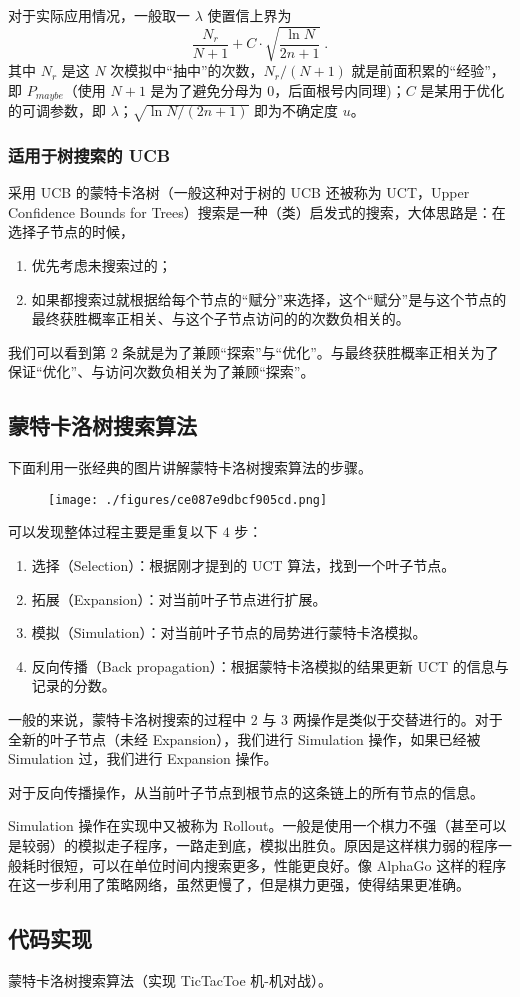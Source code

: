 对于实际应用情况，一般取一 $\lambda$ 使置信上界为
$$\frac{N_r}{N+1} + C \cdot \sqrt{\frac{\ln N}{2n+1}} ~.$$
其中 $N_r$ 是这 $N$ 次模拟中“抽中”的次数，$N_r/(N+1)$ 就是前面积累的“经验”，即 $P_{maybe}$（使用 $N+1$ 是为了避免分母为 $0$，后面根号内同理)；$C$ 是某用于优化的可调参数，即 $\lambda$；$\sqrt{\ln N/(2n+1)}$ 即为不确定度 $u$。

\subsubsection{适用于树搜索的 UCB}
采用 UCB 的蒙特卡洛树（一般这种对于树的 UCB 还被称为 UCT，Upper Confidence Bounds for Trees）搜索是一种（类）启发式的搜索，大体思路是：在选择子节点的时候，
\begin{enumerate}
\item 优先考虑未搜索过的；
\item 如果都搜索过就根据给每个节点的“赋分”来选择，这个“赋分”是与这个节点的最终获胜概率正相关、与这个子节点访问的的次数负相关的。
\end{enumerate}
我们可以看到第 $2$ 条就是为了兼顾“探索”与“优化”。与最终获胜概率正相关为了保证“优化”、与访问次数负相关为了兼顾“探索”。

\subsection{蒙特卡洛树搜索算法}
下面利用一张经典的图片讲解蒙特卡洛树搜索算法的步骤。
\begin{figure}[ht]
\centering
\texttt{[image: ./figures/ce087e9dbcf905cd.png]}
\caption{} \label{fig_MCTS_1}
\end{figure}
可以发现整体过程主要是重复以下 $4$ 步：
\begin{enumerate}
\item 选择（Selection）：根据刚才提到的 UCT 算法，找到一个叶子节点。
\item 拓展（Expansion）：对当前叶子节点进行扩展。
\item 模拟（Simulation）：对当前叶子节点的局势进行蒙特卡洛模拟。
\item 反向传播（Back propagation）：根据蒙特卡洛模拟的结果更新 UCT 的信息与记录的分数。
\end{enumerate}
一般的来说，蒙特卡洛树搜索的过程中 $2$ 与 $3$ 两操作是类似于交替进行的。对于全新的叶子节点（未经 Expansion），我们进行 Simulation 操作，如果已经被 Simulation 过，我们进行 Expansion 操作。

对于反向传播操作，从当前叶子节点到根节点的这条链上的所有节点的信息。

Simulation 操作在实现中又被称为 Rollout。一般是使用一个棋力不强（甚至可以是较弱）的模拟走子程序，一路走到底，模拟出胜负。原因是这样棋力弱的程序一般耗时很短，可以在单位时间内搜索更多，性能更良好。像 AlphaGo 这样的程序在这一步利用了策略网络，虽然更慢了，但是棋力更强，使得结果更准确。

\subsection{代码实现}
蒙特卡洛树搜索算法（实现 TicTacToe 机-机对战）。
